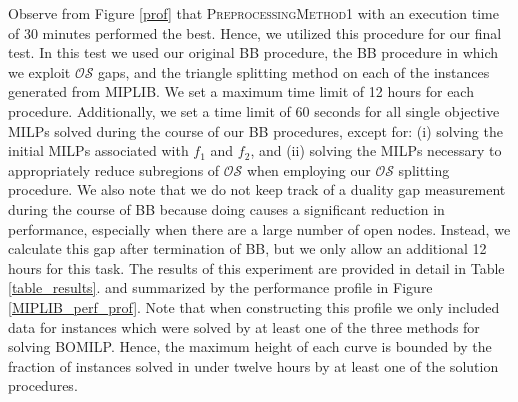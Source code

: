 \documentclass[11.5pt]{article}
\newcommand{\OS}{\mathcal{OS}}
\begin{document}
Observe from Figure \ref{prof} that \textsc{PreprocessingMethod1} with an execution time of 30 minutes performed the best. Hence, we utilized this procedure for our final test. In this test we used our original BB procedure, the BB procedure in which we exploit $\OS$ gaps, and the triangle splitting method on each of the instances generated from MIPLIB. We set a maximum time limit of 12 hours for each procedure. Additionally, we set a time limit of 60 seconds for all single objective MILPs solved during the course of our BB procedures, except for: (i) solving the initial MILPs associated with $f_1$ and $f_2$, and (ii) solving the MILPs necessary to appropriately reduce subregions of $\OS$ when employing our $\OS$ splitting procedure. We also note that we do not keep track of a duality gap measurement during the course of BB because doing causes a significant reduction in performance, especially when there are a large number of open nodes. Instead, we calculate this gap after termination of BB, but we only allow an additional 12 hours for this task. The results of this experiment are provided in detail in Table \ref{table_results}. and summarized by the performance profile in Figure \ref{MIPLIB_perf_prof}. Note that when constructing this profile we only included data for instances which were solved by at least one of the three methods for solving BOMILP. Hence, the maximum height of each curve is bounded by the fraction of instances solved in under twelve hours by at least one of the solution procedures.
\end{document}
